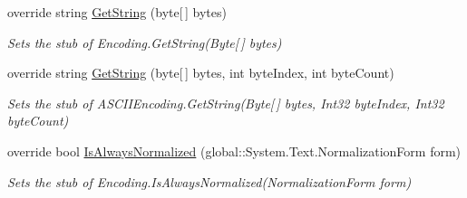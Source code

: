 \begin{DoxyCompactItemize}
override string \hyperlink{class_system_1_1_text_1_1_fakes_1_1_stub_a_s_c_i_i_encoding_a404077d7c6863a18c523cde399bdd802}{Get\-String} (byte\mbox{[}$\,$\mbox{]} bytes)
\begin{DoxyCompactList}\small\item\em Sets the stub of Encoding.\-Get\-String(\-Byte\mbox{[}$\,$\mbox{]} bytes)\end{DoxyCompactList}\item 
override string \hyperlink{class_system_1_1_text_1_1_fakes_1_1_stub_a_s_c_i_i_encoding_af36f7fa68fea56a4efb8571452f578ba}{Get\-String} (byte\mbox{[}$\,$\mbox{]} bytes, int byte\-Index, int byte\-Count)
\begin{DoxyCompactList}\small\item\em Sets the stub of A\-S\-C\-I\-I\-Encoding.\-Get\-String(\-Byte\mbox{[}$\,$\mbox{]} bytes, Int32 byte\-Index, Int32 byte\-Count)\end{DoxyCompactList}\item 
override bool \hyperlink{class_system_1_1_text_1_1_fakes_1_1_stub_a_s_c_i_i_encoding_aa62d2b3aed66242b55fc3790c5b6fa35}{Is\-Always\-Normalized} (global\-::\-System.\-Text.\-Normalization\-Form form)
\begin{DoxyCompactList}\small\item\em Sets the stub of Encoding.\-Is\-Always\-Normalized(\-Normalization\-Form form)\end{DoxyCompactList}\end{DoxyCompactItemize}
